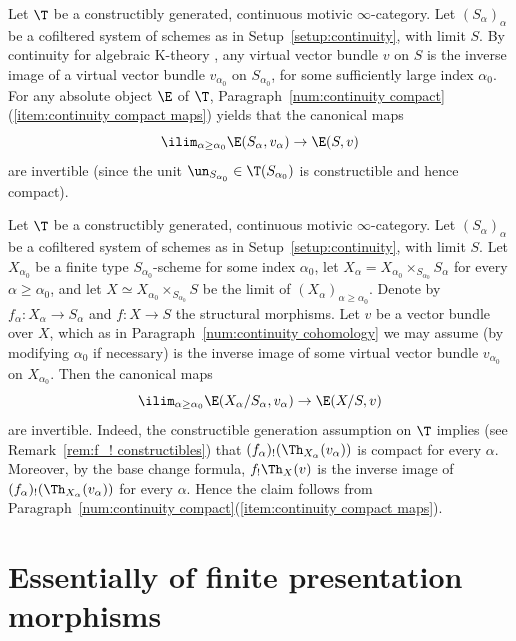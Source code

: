 \begin{num}\label{num:continuity cohomology}
Let $\T$ be a constructibly generated, continuous motivic $\infty$-category.
Let $(S_\alpha)_\alpha$ be a cofiltered system of schemes as in Setup~\ref{setup:continuity}, with limit $S$.
By continuity for algebraic K-theory \cite[Th.\,7.2]{TT}, any virtual vector bundle $v$ on $S$ is the inverse image of a virtual vector bundle $v_{\alpha_0}$ on $S_{\alpha_0}$, for some sufficiently large index $\alpha_0$.
For any absolute object $\E$ of $\T$, Paragraph~\ref{num:continuity compact}(\ref{item:continuity compact maps}) yields that the canonical maps
\[
\ilim_{\alpha\ge\alpha_0} \E(S_{\alpha}, v_{\alpha})
\to \E(S, v)
\]
are invertible (since the unit $\un_{S_{\alpha_0}} \in \T(S_{\alpha_0})$ is constructible and hence compact).
\end{num}

\begin{num}\label{num:continuity bivariant}
Let $\T$ be a constructibly generated, continuous motivic $\infty$-category.
Let $(S_\alpha)_\alpha$ be a cofiltered system of schemes as in Setup~\ref{setup:continuity}, with limit $S$.
Let $X_{\alpha_0}$ be a finite type $S_{\alpha_0}$-scheme for some index $\alpha_0$, let $X_\alpha = X_{\alpha_0} \times_{S_{\alpha_0}} S_\alpha$ for every $\alpha\ge\alpha_0$, and let $X \simeq X_{\alpha_0} \times_{S_{\alpha_0}} S$ be the limit of $(X_\alpha)_{\alpha\ge\alpha_0}$.
Denote by $f_\alpha : X_\alpha \to S_\alpha$ and $f : X \to S$ the structural morphisms.
Let $v$ be a vector bundle over $X$, which as in Paragraph~\ref{num:continuity cohomology} we may assume (by modifying $\alpha_0$ if necessary) is the inverse image of some virtual vector bundle $v_{\alpha_0}$ on $X_{\alpha_0}$.
Then the canonical maps
\[
\ilim_{\alpha\ge\alpha_0} \E(X_\alpha/S_\alpha, v_\alpha)
\to \E(X/S, v)
\]
are invertible.
Indeed, the constructible generation assumption on $\T$ implies (see Remark~\ref{rem:f_! constructibles}) that $(f_\alpha)_!(\Th_{X_\alpha}(v_\alpha))$ is compact for every $\alpha$.
Moreover, by the base change formula, $f_!\Th_X(v)$ is the inverse image of $(f_\alpha)_!(\Th_{X_\alpha}(v_\alpha))$ for every $\alpha$.
Hence the claim follows from Paragraph~\ref{num:continuity compact}(\ref{item:continuity compact maps}).
\end{num}

\section{Essentially of finite presentation morphisms}
\label{apd:efp}

